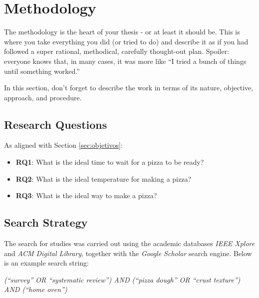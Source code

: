 \chapter{Methodology}
\label{chap:metodologia}

The methodology is the heart of your thesis - or at least it should be. This is where you take everything you did (or tried to do) and describe it as if you had followed a super rational, methodical, carefully thought-out plan. Spoiler: everyone knows that, in many cases, it was more like \enquote{I tried a bunch of things until something worked.}

In this section, don't forget to describe the work in terms of its nature, objective, approach, and procedure.

\section{Research Questions}
\label{sub:questoes_pesquisa}

As aligned with Section \ref{sec:objetivos}:

\begin{itemize}
    \item \textbf{RQ1}: What is the ideal time to wait for a pizza to be ready?
    \item \textbf{RQ2}: What is the ideal temperature for making a pizza?
    \item \textbf{RQ3}: What is the ideal way to make a pizza?
\end{itemize}

\section{Search Strategy}
\label{sub:estrategia_pesquisa}

The search for studies was carried out using the academic databases \textit{\gls{IEEE} Xplore} and \textit{\gls{ACM} Digital Library}, together with the \textit{Google Scholar} search engine. Below is an example search string: \newline

\textit{(\enquote{survey} OR \enquote{systematic review}) AND (\enquote{pizza dough} OR \enquote{crust texture}) AND (\enquote{home oven})}\newline



